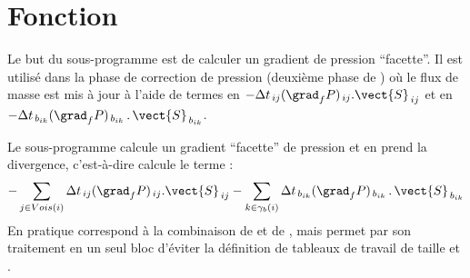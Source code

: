 %
%
%
%
%
%
%
%


\vspace{1cm}
\section{Fonction}
Le but du sous-programme  est de calculer un gradient de pression
``facette''. Il est utilis\'e dans la phase de correction de pression
(deuxi\`eme phase de ) o\`u le flux de masse est mis \`a jour \`a l'aide de termes en $-\Delta t_{\,ij}(\grad_f P)_{\,ij}.\vect{S}_{\,ij}$ et en $-\Delta t_{\,b_{ik}}(\grad_f P)_{\,b_{ik}}\,.\,\vect{S}_{\,b_{ik}}$.

Le sous-programme  calcule un gradient ``facette'' de pression et
en prend la divergence, c'est-\`a-dire calcule le terme :
\begin{displaymath}
-\sum\limits_{j\in Vois(i)}\Delta t_{\,ij}(\grad_f P)_{\,ij}.\vect{S}_{\,ij}
-\sum\limits_{k\in\gamma_b(i)}\Delta t_{\,b_{ik}}(\grad_f P)_{\,b_{ik}}\,.\,\vect{S}_{\,b_{ik}}
\end{displaymath}
En pratique  correspond \`a la combinaison de  et de
, mais permet par son traitement en un seul bloc d'\'eviter la
d\'efinition de tableaux de travail de taille  et .


